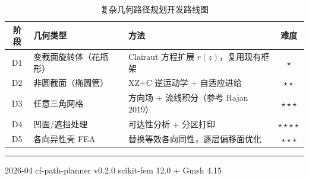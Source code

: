 \documentclass[11pt,a4paper]{article}
\begin{document}
\begin{table}[H]
\centering
\small
\begin{tabularx}{\textwidth}{c l X c}
\toprule
\textbf{阶段} & \textbf{几何类型} & \textbf{方法} & \textbf{难度} \\
\midrule
D1 & 变截面旋转体（花瓶形） & Clairaut 方程扩展 $r(z)$，复用现有框架 & $\star$ \\
D2 & 非圆截面（椭圆管） & XZ+C 逆运动学 + 自适应进给 & $\star\star$ \\
D3 & 任意三角网格 & 方向场 + 流线积分（参考 Rajan 2019） & $\star\star\star$ \\
D4 & 凹面/遮挡处理 & 可达性分析 + 分区打印 & $\star\star\star\star$ \\
D5 & 各向异性壳 FEA & 替换等效各向同性，逐层偏移面优化 & $\star\star\star$ \\
\bottomrule
\end{tabularx}
\caption{复杂几何路径规划开发路线图}
\end{table}

\vfill
\noindent\rule{\textwidth}{0.5pt}
{\small 2026-04 \quad cf-path-planner v0.2.0 \quad scikit-fem 12.0 + Gmsh 4.15}
\end{document}
